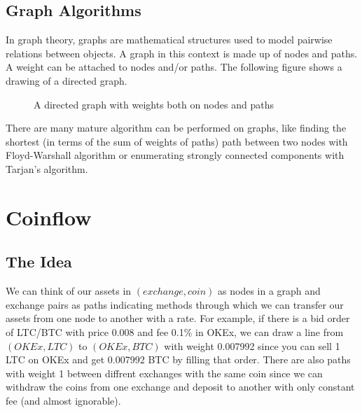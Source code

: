 \documentclass{manuscript}
\begin{document}
    \subsection{Graph Algorithms}

    In graph theory, graphs are mathematical structures used to model pairwise relations between objects. A graph in this
    context is made up of nodes and paths. A weight can be attached to nodes and/or paths. The following figure shows a
    drawing of a directed graph.

    \begin{figure}[h]
        \centering
        \caption{A directed graph with weights both on nodes and paths}\label{Fig:1}
    \end{figure}

    There are many mature algorithm can be performed on graphs, like finding the shortest (in terms of the sum of weights
    of paths) path between two nodes with Floyd-Warshall algorithm or enumerating strongly connected components with
    Tarjan's algorithm.

    \section{Coinflow}

    \subsection{The Idea}

    We can think of our assets in $(exchange, coin)$ as nodes in a graph and exchange pairs as paths indicating methods
    through which we can transfer our assets from one node to another with a rate. For example, if there is a bid order
    of LTC/BTC with price 0.008 and fee 0.1\% in OKEx, we can draw a line from $(OKEx, LTC)$ to $(OKEx, BTC)$ with weight
    0.007992 since you can sell 1 LTC on OKEx and get 0.007992 BTC by filling that order. There are also paths with weight
    1 between diffrent exchanges with the same coin since we can withdraw the coins from one exchange and deposit to another
    with only constant fee (and almost ignorable).
\end{document}
